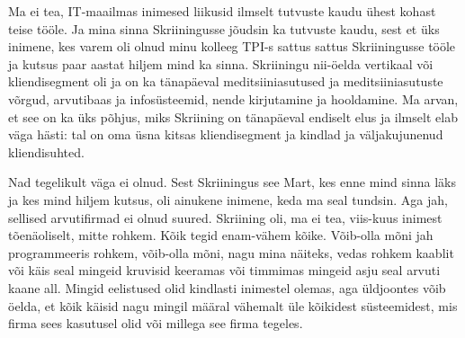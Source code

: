 
Ma ei tea, IT-maailmas inimesed liikusid ilmselt tutvuste kaudu ühest kohast teise tööle. Ja mina sinna Skriiningusse jõudsin ka  tutvuste kaudu, sest et üks inimene, kes varem oli olnud minu kolleeg TPI-s sattus sattus Skriiningusse tööle ja kutsus paar aastat hiljem mind ka sinna. Skriiningu nii-öelda vertikaal või kliendisegment oli ja on ka tänapäeval meditsiiniasutused ja meditsiiniasutuste võrgud, arvutibaas ja infosüsteemid, nende kirjutamine ja hooldamine. Ma arvan, et see on ka üks põhjus, miks Skriining on tänapäeval  endiselt elus ja ilmselt elab väga hästi: tal on oma üsna kitsas kliendisegment ja kindlad ja väljakujunenud kliendisuhted.


Nad tegelikult väga ei olnud. Sest Skriiningus see Mart, kes enne mind sinna läks ja kes mind hiljem kutsus, oli ainukene inimene, keda ma seal tundsin. Aga jah, sellised arvutifirmad ei olnud suured. Skriining oli, ma ei tea, viis-kuus inimest tõenäoliselt, mitte rohkem. Kõik tegid  enam-vähem kõike. Võib-olla mõni jah programmeeris rohkem, võib-olla mõni, nagu mina näiteks, vedas rohkem kaablit või käis seal mingeid kruvisid keeramas või timmimas mingeid asju seal arvuti kaane all. Mingid eelistused olid kindlasti inimestel olemas, aga üldjoontes võib öelda, et kõik käisid nagu mingil määral vähemalt üle kõikidest  süsteemidest, mis firma  sees kasutusel olid või millega see firma tegeles.


